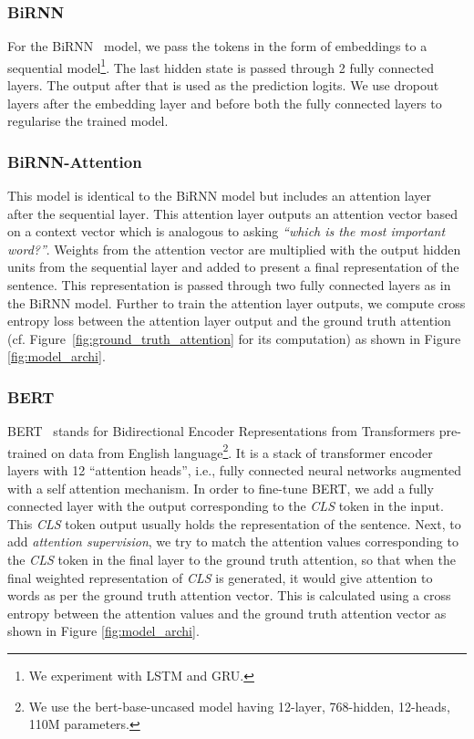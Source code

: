 \documentclass[letterpaper]{article} \usepackage{aaai21}  \usepackage{times}  \usepackage{helvet} \usepackage{courier}  \usepackage[hyphens]{url}  \usepackage{graphicx} \urlstyle{rm} \def\UrlFont{\rm}  \usepackage{natbib}  \usepackage{caption}
\begin{document}
\subsubsection{BiRNN} For the BiRNN~\cite{schuster1997bidirectional} model, we pass the tokens in the form of embeddings to a sequential model\footnote{We experiment with LSTM and GRU.}. The last hidden state is passed through 2 fully connected layers. The output after that is used as the prediction logits. We use  dropout layers after the embedding layer and before both the fully connected layers to regularise the trained model. 

\subsubsection{BiRNN-Attention} 
This model is identical to the BiRNN model but includes an attention layer~\cite{liu2016attention} after the sequential layer. This attention layer outputs an attention vector based on a context vector which is analogous to asking \textit{``which is the most important word?''}. Weights from the attention vector are multiplied with the output hidden units from the sequential layer and added to present a final representation of the sentence. This representation is passed through two fully connected layers as in the BiRNN model. Further to train the attention layer outputs, 
we compute cross entropy loss between the attention layer output and the ground truth attention (cf. Figure~\ref{fig:ground_truth_attention} for its computation) as shown in Figure \ref{fig:model_archi}. 




\subsubsection{BERT} BERT~\cite{devlin2019bert} stands for Bidirectional Encoder Representations from Transformers pre-trained on data from English language\footnote{We use the bert-base-uncased model having 12-layer, 768-hidden, 12-heads, 110M parameters.}. It is a stack of transformer encoder layers with 12 ``attention heads'', i.e., fully connected neural networks augmented with a self attention mechanism. In order to fine-tune BERT, we add a fully connected layer with the output corresponding to the \textit{CLS} token in the input. 
This \textit{CLS} token output usually holds the representation of the sentence. Next, to add \textit{attention supervision}, we try to match the attention values corresponding to the \textit{CLS} token in the final layer to the ground truth attention, so that when the final weighted representation of \textit{CLS} is generated, it would give attention to words as per the ground truth attention vector. This is calculated using a cross entropy between the attention values and the ground truth attention vector as shown in Figure \ref{fig:model_archi}.
\end{document}
